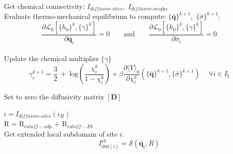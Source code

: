 \documentclass{article}
\begin{document}
    
    \begin{algorithm}
        \caption{Implicit evaluation of the Master Equation (Backward-Euler)}\label{alg:Implicit-master-equation}
        \begin{algorithmic}
        
        \State Get chemical connectivity: $I_{\textit{diffusive-sites}}$,\ $I_{\textit{diffusive-neighs}}$ \\
        
        \State Evaluate thermo-mechanical equilibrium to compute: $\{\bar{\textbf{q}}\}^{k+1}$,\ $\{\bar{\sigma}\}^{k+1}$:
        \begin{equation*}
            \frac{\partial \mathcal{L}_0[\{h_0\}^k, \{\gamma\}^k]}{\partial \bar{\textbf{q}}_i} = 0 \qquad \text{and} \qquad \frac{\partial \mathcal{L}_0[\{h_0\}^k, \{\gamma\}^k]}{\partial \bar{\sigma}_i} = 0
        \end{equation*}\\
        
        \State Update the chemical multiplier $\{\gamma\}$
        \begin{equation*}
            \gamma_i^{k+1} = \frac{3}{2}\ +\ \text{log}\left(\frac{\chi_i^{k}}{1 - \chi_i^{k}}\right) + \beta \frac{\partial \langle V \rangle_0}{\partial \chi_i^k}(\{\bar{\textbf{q}}\}^{k+1},\{\bar{\sigma}\}^{k+1})\ \quad \forall i \in I_{\text{I}}
        \end{equation*}
        
        \State Set to zero the diffusivity matrix $\left[\textbf{D}\right]$\\
        
        \vspace{0.2cm}  
            \vspace{0.2cm}  
        
            \State $i = I_{\textit{diffusive-sites}}(i_H)$ \\
            
            \State R = R$_{cutoff-adp}$ + R$_{cutoff-Eb}$  \\
        
            \State Get extended local subdomain of site $i$:
            \begin{equation*}
                I_{\text{sbd}(i)}^{eb} = \mathcal{S}(\bar{\mathbf{q}}_i,R)
            \end{equation*}\\
        

\end{algorithmic}
\end{algorithm}
\end{document}
